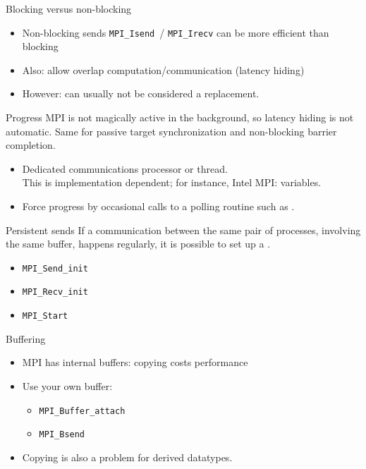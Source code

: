 \begin{numberedframe}{Blocking versus non-blocking}
  \begin{itemize}
  \item Non-blocking sends \lstinline{MPI_Isend}~/ \lstinline{MPI_Irecv} can be more
    efficient than blocking
  \item Also: allow overlap computation/communication (latency hiding)
  \item However: can usually not be considered a replacement.
  \end{itemize}
\end{numberedframe}

\begin{numberedframe}{Progress}
  MPI is not magically active in the background, so latency hiding is
  not automatic. Same for passive target synchronization and
  non-blocking barrier completion.
  \begin{itemize}
  \item Dedicated communications processor or thread.\\
    This is implementation dependent; for instance,
    Intel MPI:  variables.
  \item Force progress by occasional calls to a polling
    routine such as .
  \end{itemize}
\end{numberedframe}

\begin{numberedframe}{Persistent sends}
  If a communication between the same pair of processes, involving the
  same buffer, happens regularly, it is possible to set up a
  .

  \begin{itemize}
  \item \lstinline{MPI_Send_init}
  \item \lstinline{MPI_Recv_init}
  \item \lstinline{MPI_Start}
  \end{itemize}

\end{numberedframe}

\begin{numberedframe}{Buffering}

  \begin{itemize}
  \item MPI has internal buffers: copying costs performance
  \item Use your own buffer:
    \begin{itemize}
    \item \lstinline{MPI_Buffer_attach}
    \item \lstinline{MPI_Bsend}
    \end{itemize}
  \item Copying is also a problem for derived datatypes.
  \end{itemize}
\end{numberedframe}

